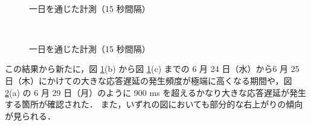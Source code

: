 \documentclass[a4j]{jarticle}
\begin{document}
\begin{description}
\begin{figure}[tb]
\begin{center}
{}~
\caption{一日を通じた計測（15 秒間隔）}
\label{data3-1}
\end{center}
\end{figure}
\begin{figure}[tb]
\begin{center}
~
\\
\caption{一日を通じた計測（15 秒間隔）}
\label{data3-2}
\end{center}
\end{figure}
この結果から新たに，図 \ref{data3-1}(b) から図 \ref{data3-1}(c) までの 6 月 24 日（水）から6 月 25 日（木）にかけての大きな応答遅延の発生頻度が極端に高くなる期間や，図 \ref{data3-2}(a) の 6 月 29 日（月）のように 900 ms を超えるかなり大きな応答遅延が発生する箇所が確認された．
また，いずれの図においても部分的な右上がりの傾向が見られる．
\end{description}
\end{document}
